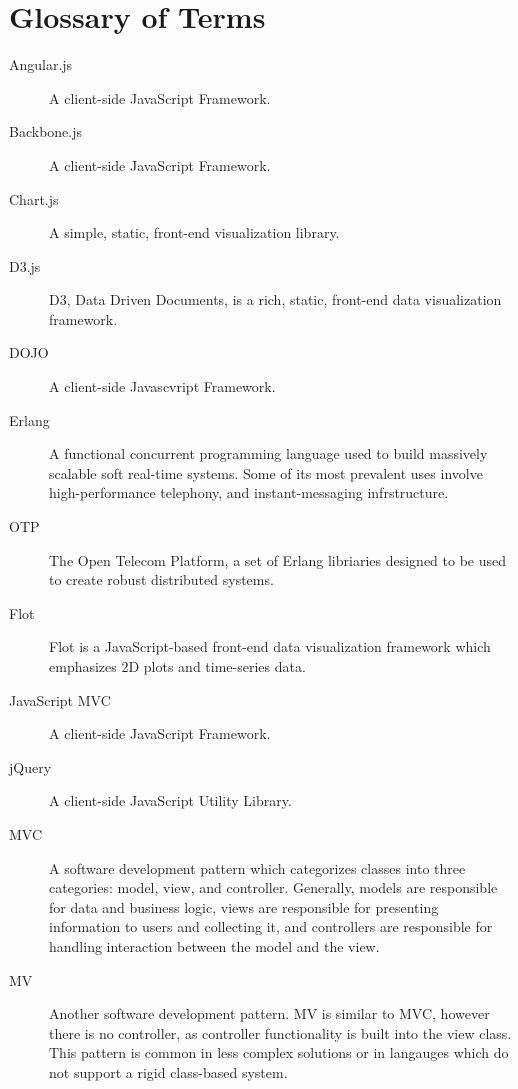 \documentclass{report}
\begin{document}


\dotableofcontents

\newpage

\chapter*{Glossary of Terms}
\begin{description}
\item[Angular.js] A client-side JavaScript Framework.
\item[Backbone.js] A client-side JavaScript Framework.
\item[Chart.js] A simple, static, front-end visualization library.
\item[D3.js] D3, Data Driven Documents, is a rich, static, front-end data visualization framework.
\item[DOJO] A client-side Javascvript Framework.
\item[Erlang] A functional concurrent programming language used to build massively scalable soft real-time systems. Some of its most prevalent uses involve high-performance telephony, and instant-messaging infrstructure.
\item[OTP] The Open Telecom Platform, a set of Erlang libriaries designed to be used to create robust distributed systems.
\item[Flot] Flot is a JavaScript-based front-end data visualization framework which emphasizes 2D plots and time-series data.
\item[JavaScript MVC] A client-side JavaScript Framework.
\item[jQuery] A client-side JavaScript Utility Library.
\item[MVC] A software development pattern which categorizes classes into three categories: model, view, and controller. Generally, models are responsible for data and business logic, views are responsible for presenting information to users and collecting it, and controllers are responsible for handling interaction between the model and the view.
\item[MV] Another software development pattern. MV is similar to MVC, however there is no controller, as controller functionality is built into the view class. This pattern is common in less complex solutions or in langauges which do not support a rigid class-based system.

\end{description}
\end{document}

